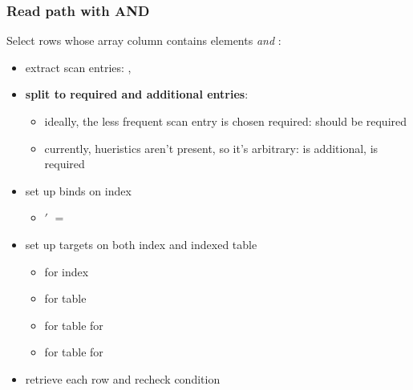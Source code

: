 \begin{frame}
  \frametitle{Read path with AND}
  Select rows whose array column contains elements  \emph{and}
  :

  \pause

  \begin{itemize}
    \item extract scan entries: , 
      \pause
    \item \textbf{split to required and additional entries}:
      \pause
      \begin{itemize}
        \item ideally, the less frequent scan entry is chosen required:
           should be required
          \pause
        \item currently, hueristics aren't present, so it's arbitrary:
           is additional,  is required
      \end{itemize}
      \pause
    \item set up binds on index
      \begin{itemize}
        \item {}$'$ $=$ 
      \end{itemize}
      \pause
    \item set up targets on both index and indexed table
      \begin{itemize}
        \item {} for index
        \item {} for table
        \item {} for table for 
        \item {} for table for 
      \end{itemize}
      \pause
    \item retrieve each row and recheck condition
  \end{itemize}
\end{frame}
